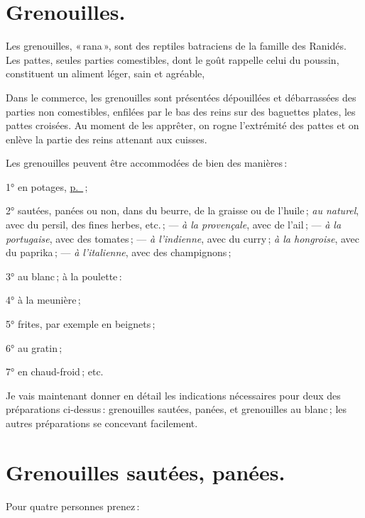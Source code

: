\section*{\centering Grenouilles.}

Les grenouilles, « rana », sont des reptiles batraciens de la famille des Ranidés.
Les pattes, seules parties comestibles, dont le goût rappelle celui du poussin,
constituent un aliment léger, sain et agréable,

Dans le commerce, les grenouilles sont présentées dépouillées et débarrassées
des parties non comestibles, enfilées par le bas des reins sur des baguettes plates,
les pattes croisées. Au moment de les apprêter, on rogne l'extrémité des pattes et
on enlève la partie des reins attenant aux cuisses.

Les grenouilles peuvent être accommodées de bien des manières :

1° en potages, \hyperlink{p0221}{p. \pageref{pg0221}} ;

2° sautées, panées ou non, dans du beurre, de la graisse ou de l'huile ;
\textit{au naturel}, avec du persil, des fines herbes, etc. ; — \textit{à la
provençale}, avec de l'ail ; — \textit{à la portugaise}, avec des tomates ;
— \textit{à l'indienne}, avec du curry ; \textit{à la hongroise}, avec du
paprika ; — \textit{à l'italienne}, avec des champignons ;

3° au blanc ; à la poulette :

4° à la meunière ;

5° frites, par exemple en beignets ;

6° au gratin ;

7° en chaud-froid ; etc.

Je vais maintenant donner en détail les indications nécessaires pour deux des
préparations ci-dessus : grenouilles sautées, panées, et grenouilles au blanc ;
les autres préparations se concevant facilement.

\section*{\centering Grenouilles sautées, panées.}

Pour quatre personnes prenez :

\medskip

